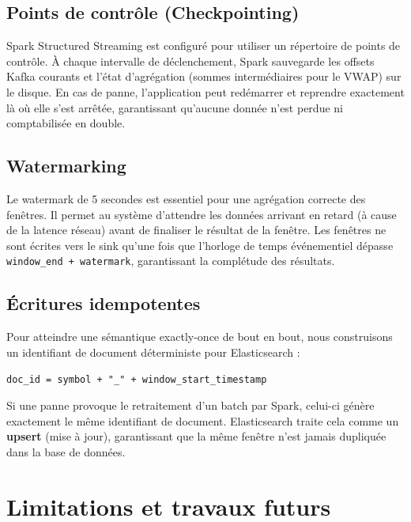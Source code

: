 \documentclass[12pt, a4paper]{article}
\begin{document}
\subsection{Points de contr\^ole (Checkpointing)}
Spark Structured Streaming est configur\'e pour utiliser un r\'epertoire de points de contr\^ole. \`A chaque intervalle de d\'eclenchement, Spark sauvegarde les offsets Kafka courants et l'\'etat d'agr\'egation (sommes interm\'ediaires pour le VWAP) sur le disque. En cas de panne, l'application peut red\'emarrer et reprendre exactement l\`a o\`u elle s'est arr\^et\'ee, garantissant qu'aucune donn\'ee n'est perdue ni comptabilis\'ee en double.

\subsection{Watermarking}
Le watermark de 5 secondes est essentiel pour une agr\'egation correcte des fen\^etres. Il permet au syst\`eme d'attendre les donn\'ees arrivant en retard (\`a cause de la latence r\'eseau) avant de finaliser le r\'esultat de la fen\^etre. Les fen\^etres ne sont \'ecrites vers le sink qu'une fois que l'horloge de temps \'ev\'enementiel d\'epasse \texttt{window\_end + watermark}, garantissant la compl\'etude des r\'esultats.

\subsection{\'Ecritures idempotentes}
Pour atteindre une s\'emantique exactly-once de bout en bout, nous construisons un identifiant de document d\'eterministe pour Elasticsearch :

\begin{infobox}
\texttt{doc\_id = symbol + "\_" + window\_start\_timestamp}

\vspace{4pt}
\small Si une panne provoque le retraitement d'un batch par Spark, celui-ci g\'en\`ere exactement le m\^eme identifiant de document. Elasticsearch traite cela comme un \textbf{upsert} (mise \`a jour), garantissant que la m\^eme fen\^etre n'est jamais dupliqu\'ee dans la base de donn\'ees.
\end{infobox}

\section{Limitations et travaux futurs}
\end{document}
